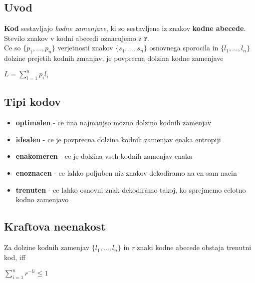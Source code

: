 \documentclass{article}
\begin{document}
\begin{multicols}{3}
\subsection{Uvod}
\textbf{Kod} sestavljajo \textit{kodne zamenjave}, ki so sestavljene iz znakov
\textbf{kodne abecede}. Stevilo znakov v kodni abecedi oznacujemo z \textbf{r}.\\
Ce so $\{p_1, \dots, p_n\}$ verjetnosti znakov $\{s_1, \dots, s_n\}$ osnovnega sporocila in $\{l_1, \dots, l_n\}$
dolzine prejetih kodnih zmanjav, je povprecna dolzina kodne zamenjave
\begin{center}
    \begin{math}
        L = \sum_{i=1}^n p_i l_i
    \end{math}
\end{center}

\subsection{Tipi kodov}
\begin{itemize}
    \item \textbf{optimalen} - ce ima najmanjso mozno dolzino kodnih zamenjav
    \item \textbf{idealen} - ce je povprecna dolzina kodnih zamenjav enaka entropiji
    \item \textbf{enakomeren} - ce je dolzina vseh kodnih zamenjav enaka
    \item \textbf{enoznacen} - ce lahko poljuben niz znakov dekodiramo na en sam nacin
    \item \textbf{trenuten} - ce lahko osnovni znak dekodiramo takoj, ko sprejmemo celotno kodno zamenjavo
\end{itemize}

\subsection{Kraftova neenakost}
Za dolzine kodnih zamenjav $\{l_1, \dots, l_n\}$ in \textit{r} znaki kodne abecede
obstaja trenutni kod, iff
\begin{center}
    \begin{math}
        \sum_{i=1}^n r^{-li} \leq 1
    \end{math}
\end{center}


\end{multicols}
\end{document}
